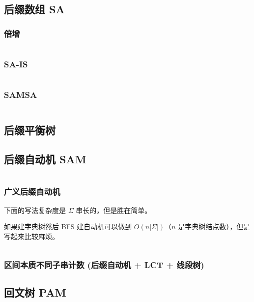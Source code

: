 \documentclass[a4paper, twoside]{article}
\begin{document}
\begin{multicols}{2}
			\subsection{后缀数组 SA}
				\subsubsection{倍增}
					\inputminted{cpp}{../src/string/sa.cpp}	

				\subsubsection{SA-IS}
					\inputminted{cpp}{../src/string/sais.cpp}
			
				\subsubsection{SAMSA}
				 	\inputminted{cpp}{../src/string/SAMSA.cpp}

			\subsection{后缀平衡树}
				

			\subsection{后缀自动机 SAM}
				\inputminted{cpp}{../src/string/后缀自动机.cpp}

				\subsubsection{广义后缀自动机}
				下面的写法复杂度是 $\Sigma$ 串长的，但是胜在简单。
				
				如果建字典树然后 BFS 建自动机可以做到 $O\left(n\left|\Sigma\right|\right)$（$n$ 是字典树结点数），但是写起来比较麻烦。
				\inputminted{cpp}{../src/string/广义后缀自动机.cpp}

				\subsubsection[区间本质不同子串计数]{区间本质不同子串计数 (后缀自动机 + LCT + 线段树)}
					

			\subsection{回文树 PAM}
				\inputminted{cpp}{../src/string/回文树.cpp}


\end{multicols}
\end{document}
